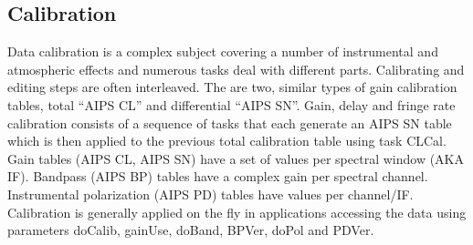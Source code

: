 \documentclass[11pt]{report}
\begin{document}
\subsection{Calibration}
Data calibration is a complex subject covering a number of
instrumental and atmospheric effects and numerous tasks deal with
different parts.
Calibrating and editing steps are often interleaved.
The are two, similar types of gain calibration tables, total ``AIPS CL''
and differential ``AIPS SN''.
Gain, delay and fringe rate calibration consists of a sequence of
tasks that each generate an AIPS SN table which is then applied to the
previous total calibration table using task CLCal. 
Gain tables (AIPS CL, AIPS SN) have a set of values per spectral window
(AKA IF).
Bandpass (AIPS BP) tables have a complex gain per spectral channel.
Instrumental polarization (AIPS PD) tables have values per channel/IF.
Calibration is generally applied on the fly in applications accessing
the data using parameters doCalib, gainUse, doBand, BPVer, doPol and
PDVer. 
\end{document}
